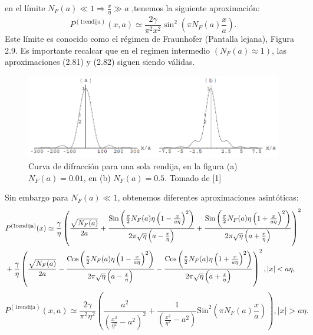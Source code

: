 en el límite $N_F(a)\ll 1\Rightarrow \frac{x}{\eta}\gg a$ ,tenemos la siguiente aproximación:
\begin{equation}
P^{(\text{1rendija})}(x,a)\simeq\frac{2\gamma}{\pi^{2}x^{2}}\sin^{2}\left(\pi N_{F}(a)\frac{x}{a}\right) .
\end{equation}
Este límite es conocido como el régimen de Fraunhofer (Pantalla lejana), Figura 2.9. Es importante recalcar que en el regimen intermedio $(N_F(a)\approx 1)$, las aproximaciones (2.81) y (2.82) siguen siendo válidas.
\begin{figure}[h]
\centering
\includegraphics[width=13cm]{Imagenes/Fig9}
\caption[Patron de interferencia, 1 rendija, regimen de Fraunhofer]{Curva de difracción para una sola rendija, en la figura (a) $N_F(a)=0.01$, en (b) $N_F(a)=0.5$. Tomado de [1]}
\end{figure}
Sin embargo para $N_F(a)\ll 1$, obtenemos diferentes aproximaciones asintóticas:
\begin{eqnarray}
\nonumber &P^{(\text{1rendija})}(x)\simeq\frac{\gamma}{\eta}\left(\frac{\sqrt{N_{F}(a)}}{2a}+\frac{\text{\text{Sin}}\left(\frac{\pi}{2}N_{F}(a)\eta\left(1-\frac{x}{a\eta}\right)^{2}\right)}{2\pi\sqrt{\eta}\left(a-\frac{x}{\eta}\right)}+\frac{\text{\text{Sin}}\left(\frac{\pi}{2}N_{F}(a)\eta\left(1+\frac{x}{a\eta}\right)^{2}\right)}{2\pi\sqrt{\eta}\left(a+\frac{x}{\eta}\right)}\right)^{2}\\
&+\frac{\gamma}{\eta}\left(\frac{\sqrt{N_{F}(a)}}{2a}-\frac{\text{\text{Cos}}\left(\frac{\pi}{2}N_{F}(a)\eta\left(1-\frac{x}{a\eta}\right)^{2}\right)}{2\pi\sqrt{\eta}\left(a-\frac{x}{\eta}\right)}-\frac{\text{\text{Cos}}\left(\frac{\pi}{2}N_{F}(a)\eta\left(1+\frac{x}{a\eta}\right)^{2}\right)}{2\pi\sqrt{\eta}\left(a+\frac{x}{\eta}\right)}\right)^{2},|x|<a\eta ,
\end{eqnarray}
\begin{equation}
P^{(\text{1rendija})}(x,a)\simeq\frac{2\gamma}{\pi^{2}\eta^{2}}\left(\frac{a^{2}}{\left(\frac{x^{2}}{\eta^{2}}-a^{2}\right)^{2}}+\frac{1}{\left(\frac{x^{2}}{\eta^{2}}-a^{2}\right)}\text{Sin}^{2}\left(\pi N_{F}(a)\frac{x}{a}\right)\right), |x|>a\eta .
\end{equation}
